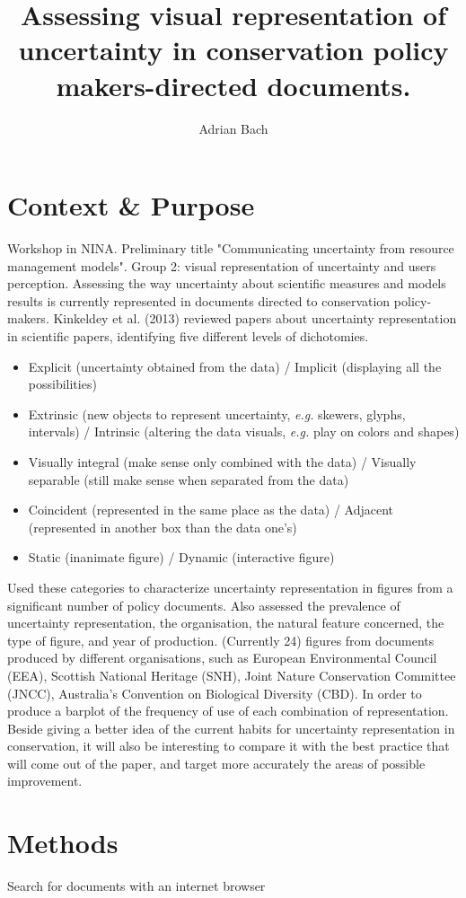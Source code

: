 \documentclass[12pt,a4paper,draft]{article}
\author{Adrian Bach}
\title{Assessing visual representation of uncertainty in conservation policy makers-directed documents.}
\begin{document}
\maketitle

\tableofcontents

\section{Context \& Purpose}

Workshop in NINA.
Preliminary title "Communicating uncertainty from resource management models".
Group 2: visual representation of uncertainty and users perception.
Assessing the way uncertainty about scientific measures and models results is currently represented in documents directed to conservation policy-makers.
Kinkeldey et al. (2013) reviewed papers about uncertainty representation in scientific papers, identifying five different levels of dichotomies.
\begin{itemize}
\item Explicit (uncertainty obtained from the data) / Implicit (displaying all the possibilities)
\item Extrinsic (new objects to represent uncertainty, \textit{e.g.} skewers, glyphs, intervals) / Intrinsic (altering the data visuals, \textit{e.g.} play on colors and shapes)
\item Visually integral (make sense only combined with the data) / Visually separable (still make sense when  separated from the data)
\item Coincident (represented in the same place as the data) / Adjacent (represented in another box than the data one's)
\item Static (inanimate figure) / Dynamic (interactive figure)
\end{itemize}
Used these categories to characterize uncertainty representation in figures from a significant number of policy documents.
Also assessed the prevalence of uncertainty representation, the organisation, the natural feature concerned, the type of figure, and year of production. 
(Currently 24) figures from documents produced by different organisations, such as European Environmental Council (EEA), Scottish National Heritage (SNH), Joint Nature Conservation Committee (JNCC), Australia's Convention on Biological Diversity (CBD).
In order to produce a barplot of the frequency of use of each combination of representation.
Beside giving a better idea of the current habits for uncertainty representation in conservation, it will also be interesting to compare it with the best practice that will come out of the paper, and target more accurately the areas of possible improvement.

\section{Methods}

Search for documents with an internet browser 
\end{document}
